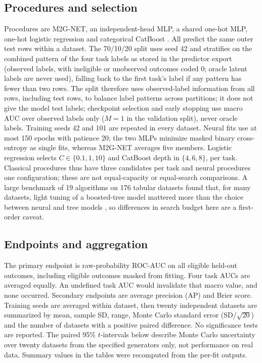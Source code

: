 \documentclass[9pt, conference, a4paper, compsocconf]{IEEEtran}
\begin{document}
\subsection{Procedures and selection}
Procedures are M2G-NET, an independent-head MLP, a shared one-hot MLP, one-hot logistic regression and categorical CatBoost \cite{Prokhorenkova2017catboost}. All predict the same outer test rows within a dataset. The 70/10/20 split uses seed 42 and stratifies on the combined pattern of the four task labels as stored in the predictor export (observed labels, with ineligible or unobserved outcomes coded 0; oracle latent labels are never used), falling back to the first task's label if any pattern has fewer than two rows. The split therefore uses observed-label information from all rows, including test rows, to balance label patterns across partitions; it does not give the model test labels; checkpoint selection and early stopping use macro AUC over observed labels only ($M=1$ in the validation split), never oracle labels. Training seeds 42 and 101 are repeated in every dataset. Neural fits use at most 150 epochs with patience 20; the two MLPs minimize masked binary cross-entropy as single fits, whereas M2G-NET averages five members. Logistic regression selects $C\in\{0.1,1,10\}$ and CatBoost depth in $\{4,6,8\}$, per task. Classical procedures thus have three candidates per task and neural procedures one configuration; these are not equal-capacity or equal-search comparisons. A large benchmark of 19 algorithms on 176 tabular datasets found that, for many datasets, light tuning of a boosted-tree model mattered more than the choice between neural and tree models \cite{McElfresh2023when}, so differences in search budget here are a first-order caveat.

\subsection{Endpoints and aggregation}
The primary endpoint is raw-probability ROC-AUC on all eligible held-out outcomes, including eligible outcomes masked from fitting. Four task AUCs are averaged equally. An undefined task AUC would invalidate that macro value, and none occurred. Secondary endpoints are average precision (AP) and Brier score. Training seeds are averaged within dataset, then twenty independent datasets are summarized by mean, sample SD, range, Monte Carlo standard error (SD/$\sqrt{20}$) and the number of datasets with a positive paired difference. No significance tests are reported. The paired 95\% $t$-intervals below describe Monte Carlo uncertainty over twenty datasets from the specified generators only, not performance on real data. Summary values in the tables were recomputed from the per-fit outputs.
\end{document}
